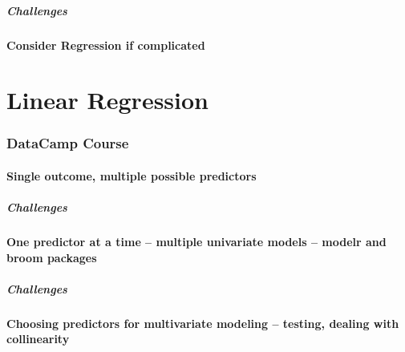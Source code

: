 \documentclass[]{book}
\let\oldparagraph\paragraph
\renewcommand{\paragraph}[1]{\oldparagraph{#1}\mbox{}}
\theoremstyle{definition}
\theoremstyle{definition}
\theoremstyle{definition}
\theoremstyle{remark}
\begin{document}
\hypertarget{challenges-4}{%
\paragraph{Challenges}\label{challenges-4}}

\hypertarget{consider-regression-if-complicated}{%
\subsubsection{Consider Regression if
complicated}\label{consider-regression-if-complicated}}

\hypertarget{linear-regression}{%
\chapter{Linear Regression}\label{linear-regression}}

\hypertarget{datacamp-course}{%
\subsection{DataCamp Course}\label{datacamp-course}}

\hypertarget{single-outcome-multiple-possible-predictors}{%
\subsubsection{Single outcome, multiple possible
predictors}\label{single-outcome-multiple-possible-predictors}}

\hypertarget{challenges-5}{%
\paragraph{Challenges}\label{challenges-5}}

\hypertarget{one-predictor-at-a-time-multiple-univariate-models-modelr-and-broom-packages}{%
\subsubsection{One predictor at a time -- multiple univariate models --
modelr and broom
packages}\label{one-predictor-at-a-time-multiple-univariate-models-modelr-and-broom-packages}}

\hypertarget{challenges-6}{%
\paragraph{Challenges}\label{challenges-6}}

\hypertarget{choosing-predictors-for-multivariate-modeling-testing-dealing-with-collinearity}{%
\subsubsection{Choosing predictors for multivariate modeling -- testing,
dealing with
collinearity}\label{choosing-predictors-for-multivariate-modeling-testing-dealing-with-collinearity}}
\end{document}
